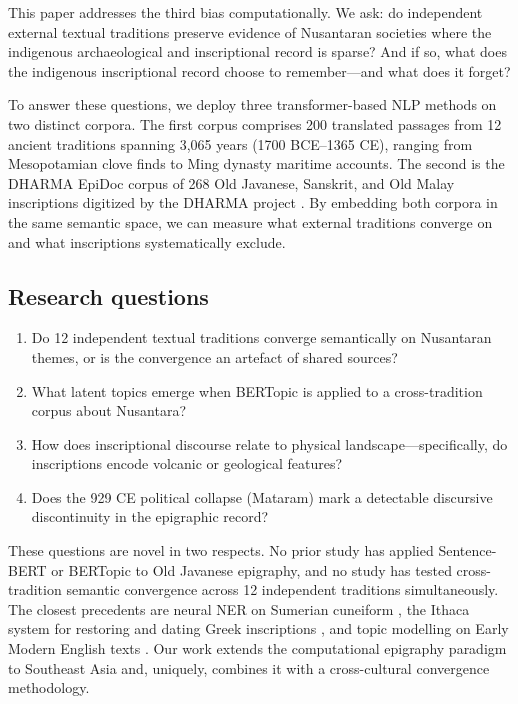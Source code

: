 \documentclass[12pt]{article}
\begin{document}
This paper addresses the third bias computationally.
We ask: do independent external textual traditions preserve evidence of Nusantaran societies where the indigenous archaeological and inscriptional record is sparse?
And if so, what does the indigenous inscriptional record choose to remember---and what does it forget?

To answer these questions, we deploy three transformer-based NLP methods on two distinct corpora.
The first corpus comprises 200 translated passages from 12 ancient traditions spanning 3,065 years (1700 BCE--1365 CE), ranging from Mesopotamian clove finds to Ming dynasty maritime accounts.
The second is the DHARMA EpiDoc corpus of 268 Old Javanese, Sanskrit, and Old Malay inscriptions digitized by the DHARMA project \citep{DHARMA2024}.
By embedding both corpora in the same semantic space, we can measure what external traditions converge on and what inscriptions systematically exclude.

\subsection{Research questions}

\begin{enumerate}
    \item Do 12 independent textual traditions converge semantically on Nusantaran themes, or is the convergence an artefact of shared sources?
    \item What latent topics emerge when BERTopic is applied to a cross-tradition corpus about Nusantara?
    \item How does inscriptional discourse relate to physical landscape---specifically, do inscriptions encode volcanic or geological features?
    \item Does the 929 CE political collapse (Mataram) mark a detectable discursive discontinuity in the epigraphic record?
\end{enumerate}

These questions are novel in two respects.
No prior study has applied Sentence-BERT or BERTopic to Old Javanese epigraphy, and no study has tested cross-tradition semantic convergence across 12 independent traditions simultaneously.
The closest precedents are neural NER on Sumerian cuneiform \citep{PagePerron2017}, the Ithaca system for restoring and dating Greek inscriptions \citep{Assael2022}, and topic modelling on Early Modern English texts \citep{Manjavacas2019}.
Our work extends the computational epigraphy paradigm to Southeast Asia and, uniquely, combines it with a cross-cultural convergence methodology.
\end{document}
